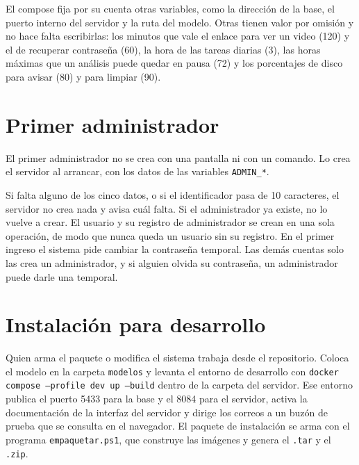 El compose fija por su cuenta otras variables, como la dirección de la base, el puerto
interno del servidor y la ruta del modelo. Otras tienen valor por omisión y no hace
falta escribirlas: los minutos que vale el enlace para ver un video (120) y el de
recuperar contraseña (60), la hora de las tareas diarias (3), las horas máximas que un
análisis puede quedar en pausa (72) y los porcentajes de disco para avisar (80) y para
limpiar (90).

\section{Primer administrador}

El primer administrador no se crea con una pantalla ni con un comando. Lo crea el
servidor al arrancar, con los datos de las variables \texttt{ADMIN\_*}.

Si falta alguno de los cinco datos, o si el identificador pasa de 10 caracteres, el
servidor no crea nada y avisa cuál falta. Si el administrador ya existe, no lo vuelve
a crear. El usuario y su registro de administrador se crean en una sola operación, de
modo que nunca queda un usuario sin su registro. En el primer ingreso el sistema pide
cambiar la contraseña temporal. Las demás cuentas solo las crea un administrador, y
si alguien olvida su contraseña, un administrador puede darle una temporal.

\section{Instalación para desarrollo}

Quien arma el paquete o modifica el sistema trabaja desde el repositorio. Coloca el
modelo en la carpeta \texttt{modelos} y levanta el entorno de desarrollo con
\texttt{docker compose --profile dev up --build} dentro de la carpeta del servidor. Ese
entorno publica el puerto 5433 para la base y el 8084 para el servidor, activa la
documentación de la interfaz del servidor y dirige los correos a un buzón de prueba que
se consulta en el navegador. El paquete de instalación se arma con el programa
\texttt{empaquetar.ps1}, que construye las imágenes y genera el \texttt{.tar} y el
\texttt{.zip}.
